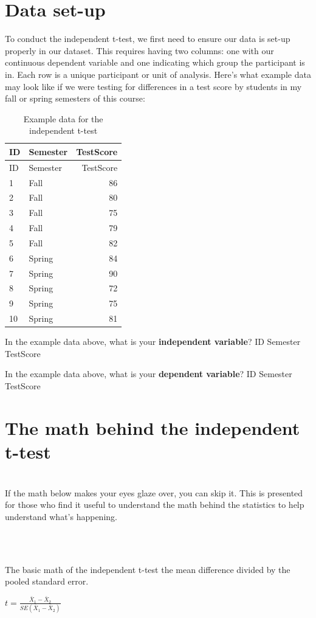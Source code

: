 \documentclass[
]{book}
\newenvironment{info}
    {
    \hline\\
    }
    { 
    \\\\\hline
    }
\begin{document}
\hypertarget{data-set-up}{%
\section{Data set-up}\label{data-set-up}}

To conduct the independent t-test, we first need to ensure our data is set-up properly in our dataset. This requires having two columns: one with our continuous dependent variable and one indicating which group the participant is in. Each row is a unique participant or unit of analysis. Here's what example data may look like if we were testing for differences in a test score by students in my fall or spring semesters of this course:

\begin{longtable}[]{@{}llr@{}}
\caption{Example data for the independent t-test}\tabularnewline
\toprule
ID & Semester & TestScore\tabularnewline
\midrule
\endfirsthead
\toprule
ID & Semester & TestScore\tabularnewline
\midrule
\endhead
1 & Fall & 86\tabularnewline
2 & Fall & 80\tabularnewline
3 & Fall & 75\tabularnewline
4 & Fall & 79\tabularnewline
5 & Fall & 82\tabularnewline
6 & Spring & 84\tabularnewline
7 & Spring & 90\tabularnewline
8 & Spring & 72\tabularnewline
9 & Spring & 75\tabularnewline
10 & Spring & 81\tabularnewline
\bottomrule
\end{longtable}

In the example data above, what is your \textbf{independent variable}? ID Semester TestScore

In the example data above, what is your \textbf{dependent variable}? ID Semester TestScore

\hypertarget{the-math-behind-the-independent-t-test}{%
\section{The math behind the independent t-test}\label{the-math-behind-the-independent-t-test}}

\begin{info}
If the math below makes your eyes glaze over, you can skip it. This is
presented for those who find it useful to understand the math behind the
statistics to help understand what's happening.
\end{info}

The basic math of the independent t-test the mean difference divided by the pooled standard error.

\(t = \frac{\bar{X}_1 - \bar{X}_2}{SE({\bar{X}_1 - \bar{X}_2})}\)
\end{document}
